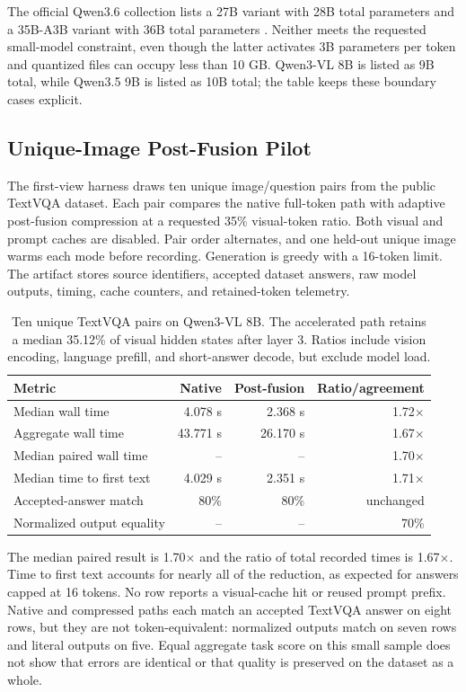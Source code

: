 \documentclass[11pt]{article}
\begin{document}
The official Qwen3.6 collection lists a 27B variant with 28B total parameters and a 35B-A3B variant with 36B total parameters \cite{qwen2026qwen36}. Neither meets the requested small-model constraint, even though the latter activates 3B parameters per token and quantized files can occupy less than 10 GB. Qwen3-VL 8B is listed as 9B total, while Qwen3.5 9B is listed as 10B total; the table keeps these boundary cases explicit.

\subsection{Unique-Image Post-Fusion Pilot}
The first-view harness draws ten unique image/question pairs from the public TextVQA dataset. Each pair compares the native full-token path with adaptive post-fusion compression at a requested 35\% visual-token ratio. Both visual and prompt caches are disabled. Pair order alternates, and one held-out unique image warms each mode before recording. Generation is greedy with a 16-token limit. The artifact  stores source identifiers, accepted dataset answers, raw model outputs, timing, cache counters, and retained-token telemetry.

\begin{table}[H]
\centering
\small
\begin{tabular}{lrrr}
\toprule
Metric & Native & Post-fusion & Ratio/agreement \\
\midrule
Median wall time & 4.078 s & 2.368 s & 1.72$\times$ \\
Aggregate wall time & 43.771 s & 26.170 s & 1.67$\times$ \\
Median paired wall time & -- & -- & 1.70$\times$ \\
Median time to first text & 4.029 s & 2.351 s & 1.71$\times$ \\
Accepted-answer match & 80\% & 80\% & unchanged \\
Normalized output equality & -- & -- & 70\% \\
\bottomrule
\end{tabular}
\caption{Ten unique TextVQA pairs on Qwen3-VL 8B. The accelerated path retains a median 35.12\% of visual hidden states after layer 3. Ratios include vision encoding, language prefill, and short-answer decode, but exclude model load.}
\label{tab:firstview}
\end{table}

The median paired result is 1.70$\times$ and the ratio of total recorded times is 1.67$\times$. Time to first text accounts for nearly all of the reduction, as expected for answers capped at 16 tokens. No row reports a visual-cache hit or reused prompt prefix. Native and compressed paths each match an accepted TextVQA answer on eight rows, but they are not token-equivalent: normalized outputs match on seven rows and literal outputs on five. Equal aggregate task score on this small sample does not show that errors are identical or that quality is preserved on the dataset as a whole.
\end{document}
